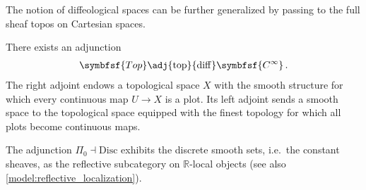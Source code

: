     The notion of diffeological spaces can be further generalized by passing to the full sheaf topos on Cartesian spaces.

    \begin{property}
        There exists an adjunction
        \begin{gather}
            \symbfsf{Top}\adj{\mathrm{top}}{\mathrm{diff}}\symbfsf{C^\infty}\,.
        \end{gather}
        The right adjoint endows a topological space $X$ with the smooth structure for which every continuous map $U\rightarrow X$ is a plot. Its left adjoint sends a smooth space to the topological space equipped with the finest topology for which all plots become continuous maps.
    \end{property}

    \begin{property}\label{topos:discrete_smooth_sets}
        The adjunction $\Pi_0\dashv\mathrm{Disc}$ exhibits the discrete smooth sets, i.e.~the constant sheaves, as the reflective subcategory on $\mathbb{R}$-local objects (see also \cref{model:reflective_localization}).
    \end{property}

